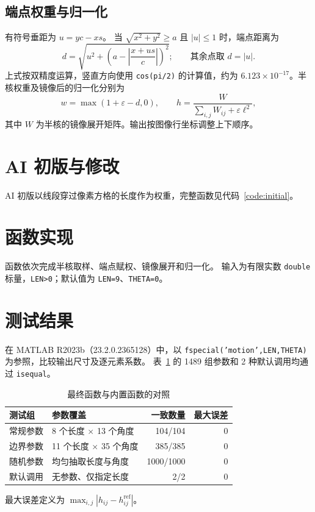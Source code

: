 \documentclass[UTF8,12pt,a4paper]{ctexart}
\newcommand{\thead}[1]{\textbf{\color{Ink}#1}}
\begin{document}
\subsection{端点权重与归一化}
有符号垂距为 $u=yc-xs$。
当 $\sqrt{x^2+y^2}\ge a$ 且 $|u|\le1$ 时，端点距离为
\begin{equation}
 d=\sqrt{u^2+\left(a-\left|\frac{x+us}{c}\right|\right)^2};
 \qquad\text{其余点取 }d=|u|.
\end{equation}
上式按双精度运算，竖直方向使用 \texttt{cos(pi/2)} 的计算值，约为
$6.123\times10^{-17}$。半核权重及镜像后的归一化分别为
\begin{equation}
 w=\max(1+\varepsilon-d,0),\qquad
 h=\frac{W}{\sum_{i,j}W_{ij}+\varepsilon\ell^2},
\end{equation}
其中 $W$ 为半核的镜像展开矩阵。输出按图像行坐标调整上下顺序。

\clearpage
\section{AI 初版与修改}
AI 初版以线段穿过像素方格的长度作为权重，完整函数见代码~\ref{code:initial}。



\clearpage
\section{函数实现}
函数依次完成半核取样、端点赋权、镜像展开和归一化。
输入为有限实数 \texttt{double} 标量，\texttt{LEN>0}；默认值为
\texttt{LEN=9}、\texttt{THETA=0}。


\clearpage
\section{测试结果}
在 MATLAB R2023b（23.2.0.2365128）中，以
\texttt{fspecial('motion',LEN,THETA)} 为参照，比较输出尺寸及逐元素系数。
表~\ref{tab:checks} 的 1489 组参数和 2 种默认调用均通过 \texttt{isequal}。
\begin{table}[H]\centering
\caption{最终函数与内置函数的对照}\label{tab:checks}
\begin{tabularx}{\linewidth}{lXrr}
\toprule
\rowcolor{Tint}\thead{测试组} & \thead{参数覆盖} & \thead{一致数量} & \thead{最大误差}\\
\midrule
常规参数 & 8 个长度 $\times$ 13 个角度 & 104/104 & 0\\
边界参数 & 11 个长度 $\times$ 35 个角度 & 385/385 & 0\\
随机参数 & 均匀抽取长度与角度 & 1000/1000 & 0\\
默认调用 & 无参数、仅指定长度 & 2/2 & 0\\
\bottomrule
\end{tabularx}
\end{table}
\noindent\small 最大误差定义为 $\max_{i,j}|h_{ij}-h^{\mathrm{ref}}_{ij}|$。\normalsize
\end{document}
